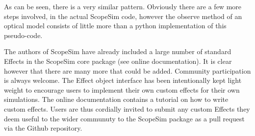 As can be seen, there is a very similar pattern.
Obviously there are a few more steps involved, in the actual ScopeSim code, however the \textquotedbl{}observe\textquotedbl{} method of an optical model consists of little more than a python implementation of this pseudo-code.

The authors of ScopeSim have already included a large number of standard Effects in the ScopeSim core package (see online documentation).
It is clear however that there are many more that could be added.
Community participation is always welcome.
The Effect object interface has been intentionally kept light weight to encourage users to implement their own custom effects for their own simulations.
The online documentation contains a tutorial on how to write custom effects.
Users are thus cordially invited to submit any custom Effects they deem useful to the wider communuty to the ScopeSim package as a pull request via the Github repository.
